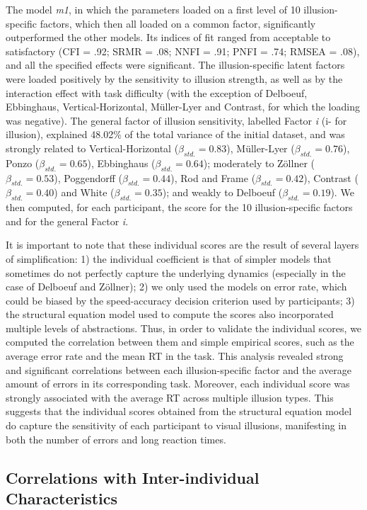 \documentclass[
  man,floatsintext]{apa6}
\begin{document}
The model \emph{m1}, in which the parameters loaded on a first level of 10 illusion-specific factors, which then all loaded on a common factor, significantly outperformed the other models. Its indices of fit ranged from acceptable to satisfactory (CFI = .92; SRMR = .08; NNFI = .91; PNFI = .74; RMSEA = .08), and all the specified effects were significant. The illusion-specific latent factors were loaded positively by the sensitivity to illusion strength, as well as by the interaction effect with task difficulty (with the exception of Delboeuf, Ebbinghaus, Vertical-Horizontal, Müller-Lyer and Contrast, for which the loading was negative). The general factor of illusion sensitivity, labelled Factor \emph{i} (i- for illusion), explained 48.02\% of the total variance of the initial dataset, and was strongly related to Vertical-Horizontal (\(\beta_{std.}=0.83\)), Müller-Lyer (\(\beta_{std.}=0.76\)), Ponzo (\(\beta_{std.}=0.65\)), Ebbinghaus (\(\beta_{std.}=0.64\)); moderately to Zöllner (\(\beta_{std.}=0.53\)), Poggendorff (\(\beta_{std.}=0.44\)), Rod and Frame (\(\beta_{std.}=0.42\)), Contrast (\(\beta_{std.}=0.40\)) and White (\(\beta_{std.}=0.35\)); and weakly to Delboeuf (\(\beta_{std.}=0.19\)). We then computed, for each participant, the score for the 10 illusion-specific factors and for the general Factor \emph{i}.

It is important to note that these individual scores are the result of several layers of simplification: 1) the individual coefficient is that of simpler models that sometimes do not perfectly capture the underlying dynamics (especially in the case of Delboeuf and Zöllner); 2) we only used the models on error rate, which could be biased by the speed-accuracy decision criterion used by participants; 3) the structural equation model used to compute the scores also incorporated multiple levels of abstractions. Thus, in order to validate the individual scores, we computed the correlation between them and simple empirical scores, such as the average error rate and the mean RT in the task. This analysis revealed strong and significant correlations between each illusion-specific factor and the average amount of errors in its corresponding task. Moreover, each individual score was strongly associated with the average RT across multiple illusion types. This suggests that the individual scores obtained from the structural equation model do capture the sensitivity of each participant to visual illusions, manifesting in both the number of errors and long reaction times.

\hypertarget{correlations-with-inter-individual-characteristics}{%
\subsection{Correlations with Inter-individual Characteristics}\label{correlations-with-inter-individual-characteristics}}
\end{document}
